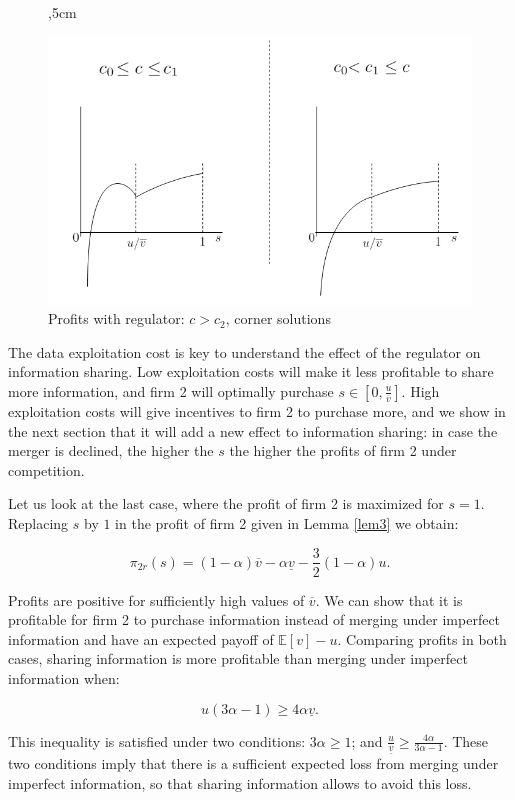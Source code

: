 \documentclass[a4paper,leqno]{article}%
\newcommand{\E}{\mathbb E}
\renewcommand{\a}{\alpha}
\newcommand{\uv}{\underline{v}}
\newcommand{\ov}{\overline{v}}
\begin{document}
\begin{figure}[H]
,5cm{
\includegraphics[scale=0.55]{Figure2}
\caption{Profits with regulator: $c>c_2$, corner solutions}\label{Figure2}}
\end{figure}

\medskip

The data exploitation cost is key to understand the effect of the regulator on information sharing. Low exploitation costs will make it less profitable to share more information, and firm 2 will optimally purchase $s\in[0,\frac{u}{\ov}]$. High exploitation costs will give incentives to firm 2 to purchase more, and we show in the next section that it will add a new effect to information sharing: in case the merger is declined, the higher the $s$ the higher the profits of firm 2 under competition.

\medskip

Let us look at the last case, where the profit of firm 2 is maximized for $s=1$. Replacing $s$ by $1$ in the profit of firm 2 given in Lemma \ref{lem3} we obtain:

$$\pi_{2r}(s)=(1-\a)\ov-\a\uv-\frac{3}{2}(1-\a)u.$$

Profits are positive for sufficiently high values of $\ov$. We can show that it is profitable for firm 2 to purchase information instead of merging under imperfect information and have an expected payoff of $\E[v]-u$. Comparing profits in both cases, sharing information is more profitable than merging under imperfect information when:

\begin{equation}\label{eq2}
    u(3\a-1)\geq 4\a\uv.
\end{equation}

This inequality is satisfied under two conditions: $3\a\geq1$; and $\frac{u}{\uv}\geq \frac{4\a}{3\a-1}$. These two conditions imply that there is a sufficient expected loss from merging under imperfect information, so that sharing information allows to avoid this loss.
\end{document}
